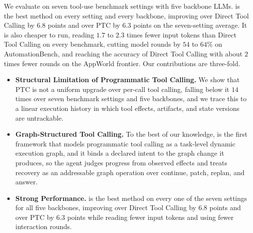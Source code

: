 We evaluate \method on seven tool-use benchmark settings with five backbone LLMs.
\method is the best method on every setting and every backbone, improving over Direct Tool Calling by $6.8$ points and over PTC by $6.3$ points on the seven-setting average.
It is also cheaper to run, reading $1.7$ to $2.3$ times fewer input tokens than Direct Tool Calling on every benchmark, cutting model rounds by $54$ to $64\%$ on AutomationBench, and reaching the accuracy of Direct Tool Calling with about $2$ times fewer rounds on the AppWorld frontier.
Our contributions are three-fold.
\begin{itemize}[leftmargin=1.2em, itemsep=-0.3ex, topsep=0ex]
    \item \textbf{Structural Limitation of Programmatic Tool Calling.} We show that PTC is not a uniform upgrade over per-call tool calling, falling below it $14$ times over seven benchmark settings and five backbones, and we trace this to a linear execution history in which tool effects, artifacts, and state versions are untrackable.
    \item \textbf{Graph-Structured Tool Calling.} To the best of our knowledge, \method is the first framework that models programmatic tool calling as a task-level dynamic execution graph, and it binds a declared intent to the graph change it produces, so the agent judges progress from observed effects and treats recovery as an addressable graph operation over continue, patch, replan, and answer.
    \item \textbf{Strong Performance.} \method is the best method on every one of the seven settings for all five backbones, improving over Direct Tool Calling by $6.8$ points and over PTC by $6.3$ points while reading fewer input tokens and using fewer interaction rounds.
\end{itemize}
